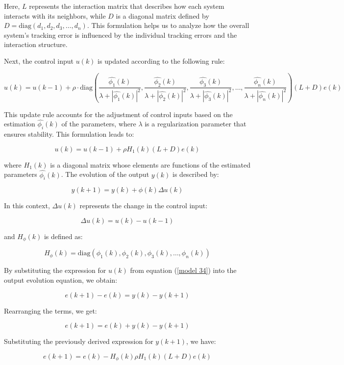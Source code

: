 \documentclass[journal,onecolumn]{IEEEtran}
\begin{document}
Here, \(L\) represents the interaction matrix that describes how each system interacts with its neighbors, while \(D\) is a diagonal matrix defined by \(D = \text{diag}(d_1, d_2, d_3, \dots, d_n)\). This formulation helps us to analyze how the overall system's tracking error is influenced by the individual tracking errors and the interaction structure.

Next, the control input \(u(k)\) is updated according to the following rule:

\[
u(k) = u(k-1) + \rho \cdot \text{diag}\left(\frac{\hat{\phi_1}(k)}{\lambda + |\hat{\phi_1}(k)|^2}, \frac{\hat{\phi_2}(k)}{\lambda + |\hat{\phi_2}(k)|^2}, \frac{\hat{\phi_3}(k)}{\lambda + |\hat{\phi_3}(k)|^2}, \dots, \frac{\hat{\phi_n}(k)}{\lambda + |\hat{\phi_n}(k)|^2}\right) (L + D) e(k)
\]

This update rule accounts for the adjustment of control inputs based on the estimation \(\hat{\phi_i}(k)\) of the parameters, where \(\lambda\) is a regularization parameter that ensures stability. This formulation leads to:

\begin{equation}
    \label{model 34}
    u(k) = u(k-1) + \rho H_1(k) (L + D) e(k)
\end{equation}

where \(H_1(k)\) is a diagonal matrix whose elements are functions of the estimated parameters \(\hat{\phi_i}(k)\). The evolution of the output \(y(k)\) is described by:

\[
y(k+1) = y(k) + \phi(k) \Delta u(k)
\]

In this context, \(\Delta u(k)\) represents the change in the control input:

\[
\Delta u(k) = u(k) - u(k-1)
\]

and \(H_\phi(k)\) is defined as:

\[
H_\phi(k) = \text{diag}(\phi_1(k), \phi_2(k), \phi_3(k), \dots, \phi_n(k))
\]

By substituting the expression for \(u(k)\) from equation (\ref{model 34}) into the output evolution equation, we obtain:

\[
e(k+1) - e(k) = y(k) - y(k+1)
\]

Rearranging the terms, we get:

\[
e(k+1) = e(k) + y(k) - y(k+1)
\]

Substituting the previously derived expression for \(y(k+1)\), we have:

\[
e(k+1) = e(k) - H_\phi(k) \rho H_1(k) (L + D) e(k)
\]
\end{document}
